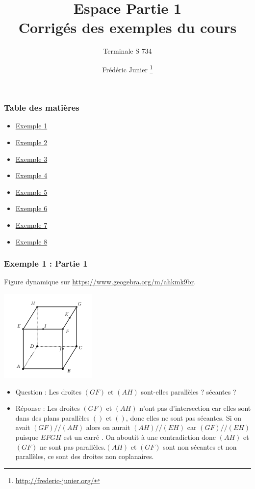 \documentclass[xcolor=svgnames,t,final]{beamer}
\title{Espace Partie 1 \\ Corrigés des exemples du cours}\subtitle{Terminale S 734}
\author[]{Frédéric Junier \thanks{\url{http://frederic-junier.org/} }}
\institute[Lycée du Parc]{Lycée du Parc, Lyon}
\date[]{}
\begin{document}
\frame{\titlepage}


\begin{frame}
\frametitle{Table des matières}
\begin{itemize}
	\item \hyperlink{exemple1}{Exemple 1}
	\item \hyperlink{exemple2}{Exemple 2}
	\item \hyperlink{exemple3}{Exemple 3}
	\item \hyperlink{exemple4}{Exemple 4}
	\item \hyperlink{exemple5}{Exemple 5}
	\item \hyperlink{exemple6}{Exemple 6}
		\item \hyperlink{exemple7}{Exemple 7}
			\item \hyperlink{exemple8}{Exemple 8}
	
\end{itemize}

\end{frame}
 

 
\begin{frame}
\label{exemple1}
\frametitle{Exemple 1 : Partie 1}

Figure dynamique sur \href{https://www.geogebra.org/m/ahkmk9br}{https://www.geogebra.org/m/ahkmk9br}.


\begin{center}
\includegraphics[scale=0.5]{images/exemple1.png}
\end{center}

\begin{itemize}
\pause \item {\color{blue} Question : Les droites $(GF)$ et $(AH)$ sont-elles
   parallèles ? sécantes ? }
\pause \item {\color{red} Réponse : Les droites $(GF)$ et $(AH)$ n'ont pas d'intersection car elles sont dans des plans parallèles $( )$ et $( ) $, donc elles ne sont pas sécantes.  Si on avait $(GF)//(AH)$ alors on aurait $(AH)//(EH)$ car $(GF)//(EH)$ puisque $EFGH$ est un carré . On aboutit à une contradiction donc $(AH)$ et $(GF)$ ne sont pas parallèles.$(AH)$ et $(GF)$ sont non sécantes et non parallèles, ce sont des droites non coplanaires.  }
\end{itemize}


\end{frame}
\end{document}
